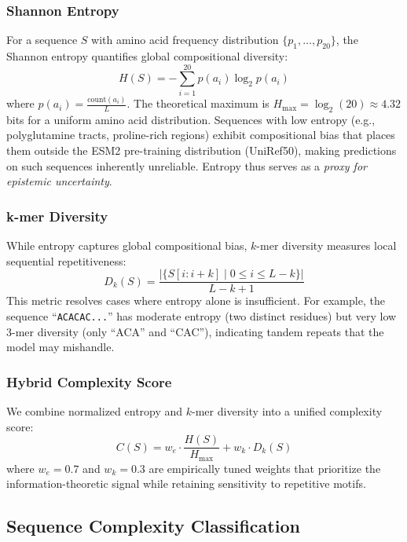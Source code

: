 \documentclass[conference]{IEEEtran}
\begin{document}
\subsubsection{Shannon Entropy}
For a sequence $S$ with amino acid frequency distribution $\{p_1, \ldots, p_{20}\}$, the Shannon entropy quantifies global compositional diversity:
\begin{equation}
    H(S) = -\sum_{i=1}^{20} p(a_i) \log_2 p(a_i)
    \label{eq:entropy}
\end{equation}
where $p(a_i) = \frac{\text{count}(a_i)}{L}$. The theoretical maximum is $H_{\max} = \log_2(20) \approx 4.32$ bits for a uniform amino acid distribution. Sequences with low entropy (e.g., polyglutamine tracts, proline-rich regions) exhibit compositional bias that places them outside the ESM2 pre-training distribution (UniRef50), making predictions on such sequences inherently unreliable. Entropy thus serves as a \textit{proxy for epistemic uncertainty}.

\subsubsection{k-mer Diversity}
While entropy captures global compositional bias, $k$-mer diversity measures local sequential repetitiveness:
\begin{equation}
    D_k(S) = \frac{|\{S[i:i+k] \mid 0 \leq i \leq L-k\}|}{L - k + 1}
    \label{eq:kmer}
\end{equation}
This metric resolves cases where entropy alone is insufficient. For example, the sequence ``\texttt{ACACAC...}'' has moderate entropy (two distinct residues) but very low 3-mer diversity (only ``ACA'' and ``CAC''), indicating tandem repeats that the model may mishandle.

\subsubsection{Hybrid Complexity Score}
We combine normalized entropy and $k$-mer diversity into a unified complexity score:
\begin{equation}
    C(S) = w_e \cdot \frac{H(S)}{H_{\max}} + w_k \cdot D_k(S)
    \label{eq:complexity}
\end{equation}
where $w_e = 0.7$ and $w_k = 0.3$ are empirically tuned weights that prioritize the information-theoretic signal while retaining sensitivity to repetitive motifs.

\subsection{Sequence Complexity Classification}
\end{document}
